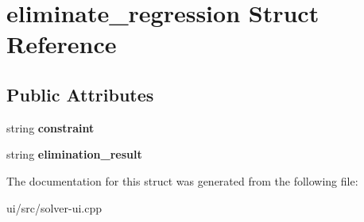 \hypertarget{structeliminate__regression}{\section{eliminate\-\_\-regression \-Struct \-Reference}
\label{structeliminate__regression}
}
\subsection*{\-Public \-Attributes}
\begin{DoxyCompactItemize}
\item 
\hypertarget{structeliminate__regression_a1157d737ce7deb0e2a58f303e658c51f}{string {\bfseries constraint}}\label{structeliminate__regression_a1157d737ce7deb0e2a58f303e658c51f}

\item 
\hypertarget{structeliminate__regression_a8e89e50d42be886e8525d2d9a468f350}{string {\bfseries elimination\-\_\-result}}\label{structeliminate__regression_a8e89e50d42be886e8525d2d9a468f350}

\end{DoxyCompactItemize}


\-The documentation for this struct was generated from the following file\-:\begin{DoxyCompactItemize}
\item 
ui/src/solver-\/ui.\-cpp\end{DoxyCompactItemize}
